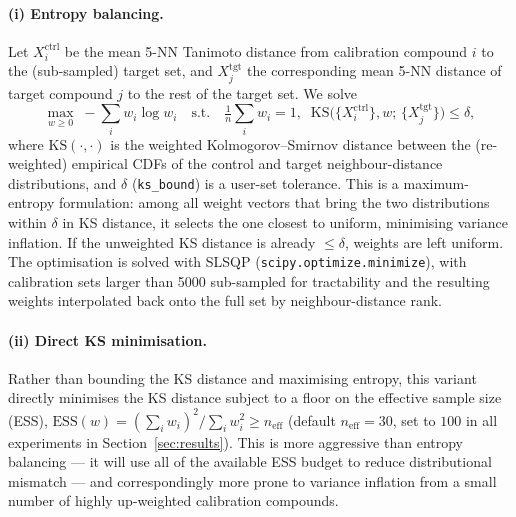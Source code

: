 \documentclass[11pt]{article}
\begin{document}
\paragraph{(i) Entropy balancing.} Let $X_i^{\mathrm{ctrl}}$ be the mean
5-NN Tanimoto distance from calibration compound $i$ to the (sub-sampled)
target set, and $X_j^{\mathrm{tgt}}$ the corresponding mean 5-NN distance of
target compound $j$ to the rest of the target set. We solve
\[
\max_{w \ge 0} \; -\sum_i w_i \log w_i
\quad \text{s.t.} \quad
\tfrac{1}{n}\textstyle\sum_i w_i = 1, \;\;
\mathrm{KS}\bigl(\{X_i^{\mathrm{ctrl}}\}, w;\, \{X_j^{\mathrm{tgt}}\}\bigr) \le \delta,
\]
where $\mathrm{KS}(\cdot,\cdot)$ is the weighted Kolmogorov--Smirnov distance
between the (re-weighted) empirical CDFs of the control and target
neighbour-distance distributions, and $\delta$ (\texttt{ks\_bound}) is a
user-set tolerance. This is a maximum-entropy formulation: among all weight
vectors that bring the two distributions within $\delta$ in KS distance, it
selects the one closest to uniform, minimising variance inflation. If the
unweighted KS distance is already $\le \delta$, weights are left uniform. The
optimisation is solved with SLSQP (\texttt{scipy.optimize.minimize}), with
calibration sets larger than 5000 sub-sampled for tractability and the
resulting weights interpolated back onto the full set by neighbour-distance
rank.

\paragraph{(ii) Direct KS minimisation.} Rather than bounding the KS distance
and maximising entropy, this variant directly minimises the KS distance
subject to a floor on the effective sample size (ESS),
$\mathrm{ESS}(w) = (\sum_i w_i)^2 / \sum_i w_i^2 \ge n_{\mathrm{eff}}$
(default $n_{\mathrm{eff}}=30$, set to $100$ in all experiments in
Section~\ref{sec:results}). This is more aggressive than entropy balancing ---
it will use all of the available ESS budget to reduce distributional
mismatch --- and correspondingly more prone to variance inflation from a small
number of highly up-weighted calibration compounds.
\end{document}
